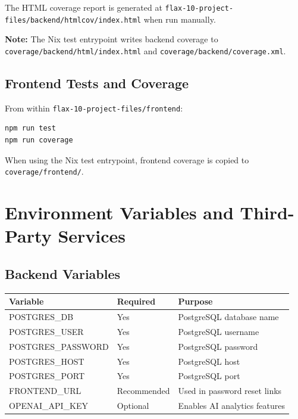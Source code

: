 \documentclass[a4paper, 12pt]{report}
\begin{document}
The HTML coverage report is generated at
\texttt{flax-10-project-files/backend/htmlcov/index.html} when run
manually.

\textbf{Note:} The Nix test entrypoint writes backend coverage to
\texttt{coverage/backend/html/index.html} and
\texttt{coverage/backend/coverage.xml}.

\section{Frontend Tests and Coverage}

From within \texttt{flax-10-project-files/frontend}:

\begin{lstlisting}[language=bash]
npm run test
npm run coverage
\end{lstlisting}

When using the Nix test entrypoint, frontend coverage is copied to
\texttt{coverage/frontend/}.

\chapter{Environment Variables and Third-Party Services}

\section{Backend Variables}

\begin{center}
\begin{longtable}{lll}
\toprule
\textbf{Variable} & \textbf{Required} & \textbf{Purpose} \\
\midrule
POSTGRES\_DB & Yes & PostgreSQL database name \\
POSTGRES\_USER & Yes & PostgreSQL username \\
POSTGRES\_PASSWORD & Yes & PostgreSQL password \\
POSTGRES\_HOST & Yes & PostgreSQL host \\
POSTGRES\_PORT & Yes & PostgreSQL port \\
FRONTEND\_URL & Recommended & Used in password reset links \\
OPENAI\_API\_KEY & Optional & Enables AI analytics features \\
\bottomrule
\end{longtable}
\end{center}
\end{document}
